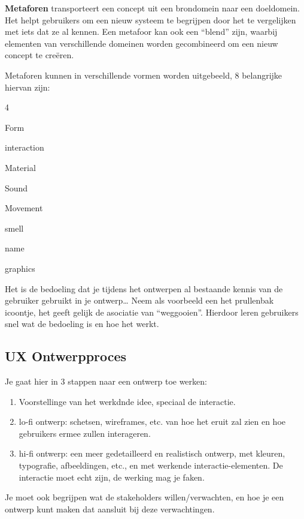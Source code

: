 \documentclass[nonacm, sigconf, balance=true]{acmart}
\begin{document}
    \textbf{Metaforen} transporteert een concept uit een brondomein naar een doeldomein.
    Het helpt gebruikers om een nieuw systeem te begrijpen door het te vergelijken met iets dat ze al kennen.
    Een metafoor kan ook een ``blend'' zijn, waarbij elementen van verschillende domeinen worden gecombineerd om een nieuw concept te creëren.

    Metaforen kunnen in verschillende vormen worden uitgebeeld, 8 belangrijke hiervan zijn:

    \begin{multicols}{4}
        \item Form
        \item interaction
        \item Material
        \item Sound
        \item Movement
        \item smell
        \item name
        \item graphics
    \end{multicols}

    Het is de bedoeling dat je tijdens het ontwerpen al bestaande kennis van de gebruiker gebruikt in je ontwerp\ldots
    Neem als voorbeeld een het prullenbak icoontje, het geeft gelijk de asociatie van ``weggooien''.
    Hierdoor leren gebruikers snel wat de bedoeling is en hoe het werkt.

    \subsection{UX Ontwerpproces}
    Je gaat hier in 3 stappen naar een ontwerp toe werken:

    \begin{enumerate}
        \item Voorstellinge van het werkdnde idee, speciaal de interactie.
        \item lo-fi ontwerp: schetsen, wireframes, etc. van hoe het eruit zal zien en hoe gebruikers ermee zullen interageren.
        \item hi-fi ontwerp: een meer gedetailleerd en realistisch ontwerp, met kleuren, typografie, afbeeldingen, etc., en met werkende interactie-elementen.
        De interactie moet echt zijn, de werking mag je faken.
    \end{enumerate}

    Je moet ook begrijpen wat de stakeholders willen/verwachten, en hoe je een ontwerp kunt maken dat aansluit bij deze verwachtingen.
\end{document}
